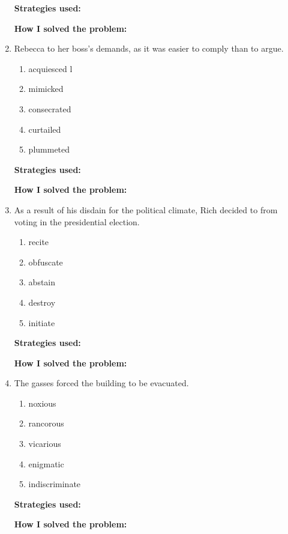 \begin{enumerate}
\large{\textbf{Strategies used:}} \hrulefill

\large{\textbf{How I solved the problem:}} \hrulefill

\item Rebecca \underline{\hspace{2in}} to her boss’s demands, as it was easier to comply than to argue.

\begin{enumerate} [label=(\Alph*)]
\item acquiesced l
\item mimicked  
\item consecrated 
\item curtailed
\item plummeted
\end{enumerate}

\large{\textbf{Strategies used:}} \hrulefill

\large{\textbf{How I solved the problem:}} \hrulefill

\item As a result of his disdain for the political climate, Rich decided to \underline{\hspace{2in}} from voting in the presidential election.

\begin{enumerate} [label=(\Alph*)]
\item recite
\item obfuscate
\item abstain
\item destroy
\item initiate
\end{enumerate}

\large{\textbf{Strategies used:}} \hrulefill

\large{\textbf{How I solved the problem:}} \hrulefill

\item The \underline{\hspace{2in}} gasses forced the building to be evacuated.

\begin{enumerate} [label=(\Alph*)]
\item noxious
\item rancorous
\item vicarious
\item enigmatic
\item indiscriminate
\end{enumerate}

\large{\textbf{Strategies used:}} \hrulefill

\large{\textbf{How I solved the problem:}} \hrulefill

\end{enumerate}

